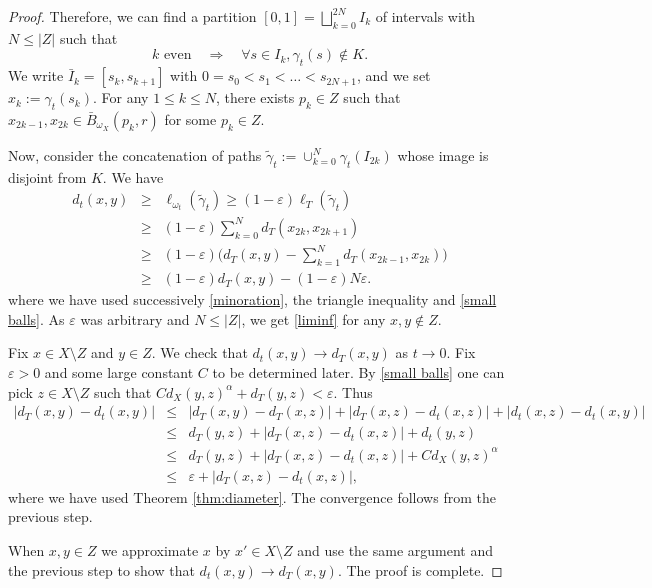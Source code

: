 \documentclass[a4paper,11pt,leqno,english]{smfart}
\theoremstyle{plain}
\theoremstyle{plain}
\numberwithin{equation}{section} %
\numberwithin{figure}{section} %
\theoremstyle{plain}
\theoremstyle{plain}
\theoremstyle{remark}
\theoremstyle{remark}
\theoremstyle{definition}
\theoremstyle{plain}
\theoremstyle{plain}
\theoremstyle{definition}
\newcommand{\e}{\varepsilon}
\newcommand{\ep}{\varepsilon}
\renewcommand{\ge}{\geq}
\renewcommand{\le}{\leq}
\begin{document}
\begin{proof}
Therefore, we can find a partition $[0,1]=\bigsqcup_{k=0}^{2N} I_{k}$ of intervals with $N\le |Z|$ such that
\[k\, \, \mbox{even}\quad  \Longrightarrow \quad  \forall s\in I_k, \gamma_t(s)\notin K.\] 
We write $\bar I_k=[s_k, s_{k+1}]$ with $0=s_0<s_1<\ldots <s_{2N+1}$, and we set $x_k:=\gamma_t(s_k)$. For any $1\le k \le N $, there exists $p_k\in Z$ such that $x_{2k-1}, x_{2k} \in \bar B_{\omega_X}(p_k,r)$ for some $p_k\in Z$. 

Now, consider the concatenation of paths $\tilde \gamma_t:=\cup_{k=0}^N \gamma_t(I_{2k})$ whose image is disjoint from $K$. We have
\begin{eqnarray*}
d_t(x,y) & \ge & \ell_{\omega_t}(\tilde \gamma_t) 
\ge (1-\ep) \ell_{T}(\tilde \gamma_t)\\
&\ge & (1-\ep) \sum_{k=0}^N d_{T}(x_{2k}, x_{2k+1}) \\
& \ge & (1-\ep) \big(d_{T}(x,y)-\sum_{k=1}^N d_{T}(x_{2k-1}, x_{2k})\big)\\
&\ge & (1-\ep)d_{T}(x,y)-(1-\ep)N\ep.
\end{eqnarray*}
where we have used successively \eqref{minoration}, the triangle inequality and \eqref{small balls}. 
As $\ep$ was arbitrary and $N\le |Z|$, we get \eqref{liminf} for any $x,y\notin Z$. 

Fix  $x \in X \setminus Z$ and $y \in Z$. We check that 
$d_t(x,y) \rightarrow d_{T}(x,y)$ as $t \rightarrow 0$. 
Fix $\e>0$ and some large constant $C$ to be determined later. By \eqref{small balls}  one can pick $z \in X \setminus Z$ such that $ Cd_X(y,z)^{\alpha}+d_{T}(y,z) <\e$.
Thus
\begin{eqnarray*}
\left| d_{T}(x,y)-d_t(x,y) \right|
& \leq & \left| d_{T}(x,y)-d_{T}(x,z) \right|+\left| d_{T}(x,z)-d_t(x,z) \right|+\left| d_{t}(x,z)-d_t(x,y) \right| \\
& \leq &  d_{T}(y,z) +\left| d_{T}(x,z)-d_t(x,z) \right|+d_{t}(y,z) \\
& \leq &  d_{T}(y,z) +\left| d_{T}(x,z)-d_t(x,z) \right|+C d_{X}(y,z)^{\alpha}  \\
& \leq & \e+\left| d_{T}(x,z)-d_t(x,z) \right|,
\end{eqnarray*}
where we have used Theorem \ref{thm:diameter}. The convergence follows from the previous step.

When $x,y \in Z$ we approximate $x$ by $x' \in X \setminus Z$ and use the same argument and the previous step to show that
$d_t(x,y) \rightarrow d_{T}(x,y)$. The proof is complete.
\end{proof}
\end{document}

